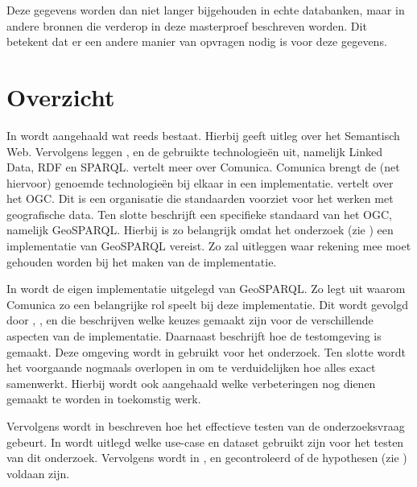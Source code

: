 Deze gegevens worden dan niet langer bijgehouden in echte databanken, maar in andere bronnen die verderop in deze masterproef beschreven worden. Dit betekent dat er een andere manier van opvragen nodig is voor deze gegevens.

\section{Overzicht}

In  wordt aangehaald wat reeds bestaat. Hierbij geeft  uitleg over het Semantisch Web. Vervolgens leggen ,  en  de gebruikte technologieën uit, namelijk Linked Data, RDF en SPARQL.  vertelt meer over Comunica. Comunica brengt de (net hiervoor) genoemde technologieën bij elkaar in een implementatie.  vertelt over het OGC. Dit is een organisatie die standaarden voorziet voor het werken met geografische data. Ten slotte beschrijft  een specifieke standaard van het OGC, namelijk GeoSPARQL. Hierbij is  zo belangrijk omdat het onderzoek (zie ) een implementatie van GeoSPARQL vereist. Zo zal  uitleggen waar rekening mee moet gehouden worden bij het maken van de implementatie.

In  wordt de eigen implementatie uitgelegd van GeoSPARQL. Zo legt  uit waarom Comunica zo een belangrijke rol speelt bij deze implementatie. Dit wordt gevolgd door , ,  en  die beschrijven welke keuzes gemaakt zijn voor de verschillende aspecten van de implementatie. Daarnaast beschrijft  hoe de testomgeving is gemaakt. Deze omgeving wordt in  gebruikt voor het onderzoek. Ten slotte wordt het voorgaande nogmaals overlopen in  om te verduidelijken hoe alles exact samenwerkt. Hierbij wordt ook aangehaald welke verbeteringen nog dienen gemaakt te worden in toekomstig werk.

Vervolgens wordt in  beschreven hoe het effectieve testen van de onderzoeksvraag gebeurt. In  wordt uitlegd welke use-case en dataset gebruikt zijn voor het testen van dit onderzoek. Vervolgens wordt in ,  en  gecontroleerd of de hypothesen (zie ) voldaan zijn.

